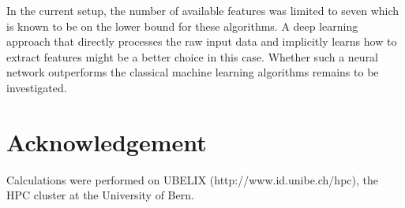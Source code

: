 \documentclass[journal]{IEEEtran}
\begin{document}
In the current setup, the number of available features was limited to seven which is known to be on the lower bound for these algorithms. A deep learning approach that directly processes the raw input data and implicitly learns how to extract features might be a better choice in this case. Whether such a neural network outperforms the classical machine learning algorithms remains to be investigated.

\section*{Acknowledgement}
Calculations were performed on UBELIX (http://www.id.unibe.ch/hpc), the HPC cluster at the University of Bern.



\end{document}
